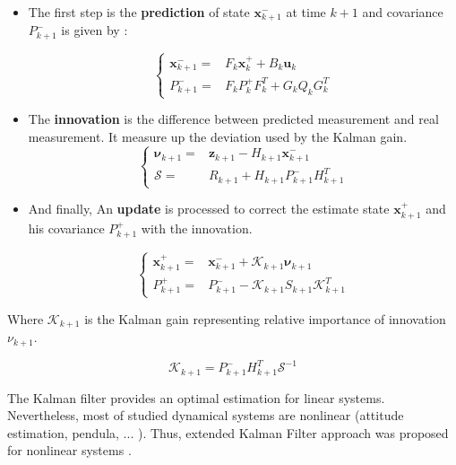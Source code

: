 \begin{itemize}
\item The first step is the \textbf{prediction} of state $\textbf{x}^-_{k+1}$ at time $k+1$ and covariance $P^-_{k+1}$ is given by :

\begin{equation}
\left\{ \begin{array}{cl}
\textbf{x}^-_{k+1} = & F_{k}\textbf{x}^+_{k} + B_{k}\textbf{u}_{k} \\
P^-_{k+1} = & F_{k}P^+_{k}F^T_{k}+G_{k}Q_{k}G^T_{k}
\end{array}
\right.
\end{equation}

\item The \textbf{innovation} is the difference between predicted measurement and real measurement. It measure up the deviation used by the Kalman gain.
\begin{equation}
\left\{ \begin{array}{cl}
\boldsymbol\nu_{k+1} = & \textbf{z}_{k+1}-H_{k+1}\textbf{x}^-_{k+1} \\
\mathcal{S} = & R_{k+1} +H_{k+1}P^-_{k+1}H^T_{k+1}
\end{array}
\right.
\end{equation}

\item And finally, An \textbf{update} is processed to correct the estimate state $\textbf{x}^+_{k+1} $ and his covariance $P^+_{k+1}$ with the innovation.

\begin{equation}
\left\{ \begin{array}{cl}
\textbf{x}^+_{k+1} = & \textbf{x}^-_{k+1} + \mathcal{K}_{k+1}\boldsymbol\nu_{k+1} \\
P^+_{k+1} = &P^-_{k+1} - \mathcal{K}_{k+1}S_{k+1}\mathcal{K}^T_{k+1}
\end{array}
\right.
\end{equation}

\end{itemize}

Where $\mathcal{K}_{k+1}$ is the Kalman gain  representing relative importance of innovation  $\nu_{k+1}$. 

\begin{equation}
\mathcal{K}_{k+1}=P^-_{k+1}H^T_{k+1}\mathcal{S}^{-1}
\end{equation}

The Kalman filter provides an optimal estimation for linear systems. Nevertheless, most of studied dynamical systems are nonlinear (attitude estimation, pendula, ... ). Thus, extended Kalman Filter approach  was proposed for nonlinear systems \cite{larson1967application, larson1967precomputation,terejanu2008extended}. 

